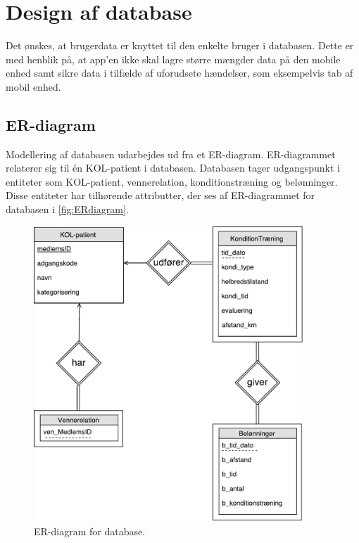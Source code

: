 \newpage
\section{Design af database} \label{sec:ER}
Det ønskes, at brugerdata er knyttet til den enkelte bruger i databasen. Dette er med henblik på, at app'en ikke skal lagre større mængder data på den mobile enhed samt sikre data i tilfælde af uforudsete hændelser, som eksempelvis tab af mobil enhed. 

\subsection*{ER-diagram}
Modellering af databasen udarbejdes ud fra et ER-diagram. ER-diagrammet relaterer sig til én KOL-patient i databasen. Databasen tager udgangspunkt i entiteter som KOL-patient, vennerelation, konditionstræning og belønninger. Disse entiteter har tilhørende attributter, der ses af ER-diagrammet for databasen i \autoref{fig:ERdiagram}.

\begin{figure} [H]
\centering
\includegraphics[width=0.9\textwidth]{figures/Aktivitetsdiagram/ERdiagram}
\caption{ER-diagram for database.}
\label{fig:ERdiagram}
\end{figure} 

